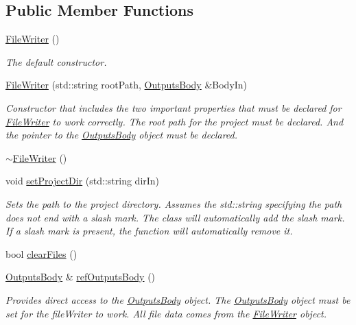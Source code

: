 \subsection*{Public Member Functions}
\begin{DoxyCompactItemize}
\item 
\hyperlink{classosea_1_1ofreq_1_1_file_writer_aa6b362f5b306dd3409af81a463e97f40}{File\-Writer} ()
\begin{DoxyCompactList}\small\item\em The default constructor. \end{DoxyCompactList}\item 
\hyperlink{classosea_1_1ofreq_1_1_file_writer_aa99ec25b5ed26ad1542eb94104fef1ce}{File\-Writer} (std\-::string root\-Path, \hyperlink{classosea_1_1ofreq_1_1_outputs_body}{Outputs\-Body} \&Body\-In)
\begin{DoxyCompactList}\small\item\em Constructor that includes the two important properties that must be declared for \hyperlink{classosea_1_1ofreq_1_1_file_writer}{File\-Writer} to work correctly. The root path for the project must be declared. And the pointer to the \hyperlink{classosea_1_1ofreq_1_1_outputs_body}{Outputs\-Body} object must be declared. \end{DoxyCompactList}\item 
\hyperlink{classosea_1_1ofreq_1_1_file_writer_ae5490307dcaf9237f4c1b8b8df433e03}{$\sim$\-File\-Writer} ()
\item 
void \hyperlink{classosea_1_1ofreq_1_1_file_writer_aa1dbf0e1a54a78fb62d799187752b002}{set\-Project\-Dir} (std\-::string dir\-In)
\begin{DoxyCompactList}\small\item\em Sets the path to the project directory. Assumes the std\-::string specifying the path does not end with a slash mark. The class will automatically add the slash mark. If a slash mark is present, the function will automatically remove it. \end{DoxyCompactList}\item 
bool \hyperlink{classosea_1_1ofreq_1_1_file_writer_a74a40c3c47b4d12582a2aa44c38d9d07}{clear\-Files} ()
\item 
\hyperlink{classosea_1_1ofreq_1_1_outputs_body}{Outputs\-Body} \& \hyperlink{classosea_1_1ofreq_1_1_file_writer_a77da1b41e1332209f39243fcca4d1287}{ref\-Outputs\-Body} ()
\begin{DoxyCompactList}\small\item\em Provides direct access to the \hyperlink{classosea_1_1ofreq_1_1_outputs_body}{Outputs\-Body} object. The \hyperlink{classosea_1_1ofreq_1_1_outputs_body}{Outputs\-Body} object must be set for the file\-Writer to work. All file data comes from the \hyperlink{classosea_1_1ofreq_1_1_file_writer}{File\-Writer} object. \end{DoxyCompactList}\item 

\end{DoxyCompactItemize}

